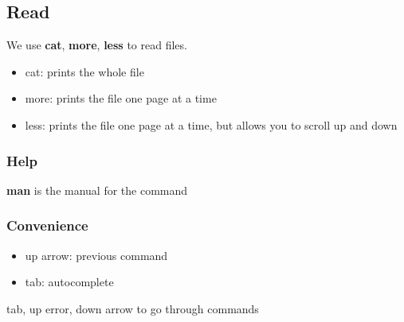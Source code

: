 \documentclass[12pt,a4paper]{article}
\begin{document}
\subsection{Read}
We use \textbf{cat}, \textbf{more}, \textbf{less} to read files.
\begin{itemize}
    \item cat: prints the whole file
    \item more: prints the file one page at a time
    \item less: prints the file one page at a time, but allows you to scroll up and down
\end{itemize}

\subsubsection{Help}
\textbf{man} is the manual for the command

\subsubsection{Convenience} 
\begin{itemize}
    \item up arrow: previous command
    \item tab: autocomplete
\end{itemize}

tab, up error, down arrow to go through commands
\end{document}
